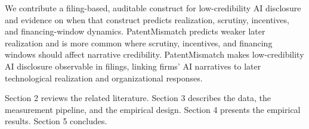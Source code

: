 We contribute a filing-based, auditable construct for low-credibility AI disclosure and evidence on when that construct predicts realization, scrutiny, incentives, and financing-window dynamics. PatentMismatch predicts weaker later realization and is more common where scrutiny, incentives, and financing windows should affect narrative credibility. PatentMismatch makes low-credibility AI disclosure observable in filings, linking firms' AI narratives to later technological realization and organizational responses.

Section 2 reviews the related literature. Section 3 describes the data, the measurement pipeline, and the empirical design. Section 4 presents the empirical results. Section 5 concludes.
